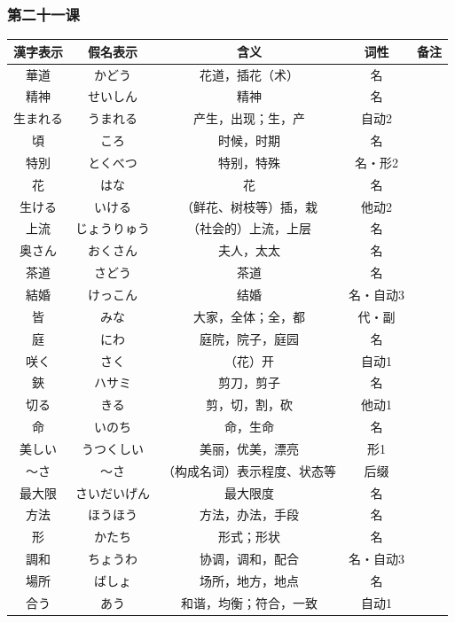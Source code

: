 \subsubsection{第二十一课}
\begin{longtable}{|c|c|c|c|c|}
    \hline
    漢字表示 & 假名表示  & 含义 & 词性 & 备注 \\ \hline\hline
    華道 & かどう & 花道，插花（术） & 名 & \\ \hline
    精神 & せいしん & 精神 & 名 & \\ \hline
    生まれる & うまれる & 产生，出现；生，产 & 自动2 & \\ \hline
    頃 & ころ & 时候，时期 & 名 & \\ \hline
    特別 & とくべつ & 特别，特殊 & 名・形2 & \\ \hline
    花 & はな & 花 & 名 & \\ \hline
    生ける & いける & （鲜花、树枝等）插，栽 & 他动2 & \\ \hline
    上流 & じょうりゅう & （社会的）上流，上层 & 名 & \\ \hline
    奥さん & おくさん & 夫人，太太 & 名 & \\ \hline
    茶道 & さどう & 茶道 & 名 & \\ \hline
    結婚 & けっこん & 结婚 & 名・自动3 & \\ \hline
    皆 & みな & 大家，全体；全，都 & 代・副 & \\ \hline
    庭 & にわ & 庭院，院子，庭园 & 名 & \\ \hline
    咲く & さく & （花）开 & 自动1 & \\ \hline
    鋏 & ハサミ & 剪刀，剪子 & 名 & \\ \hline
    切る & きる & 剪，切，割，砍 & 他动1 & \\ \hline
    命 & いのち & 命，生命 & 名 & \\ \hline
    美しい & うつくしい & 美丽，优美，漂亮 & 形1 & \\ \hline
    〜さ & 〜さ & （构成名词）表示程度、状态等 & 后缀 & \\ \hline
    最大限 & さいだいげん & 最大限度 & 名 & \\ \hline
    方法 & ほうほう & 方法，办法，手段 & 名 & \\ \hline
    形 & かたち & 形式；形状 & 名 & \\ \hline
    調和 & ちょうわ & 协调，调和，配合 & 名・自动3 & \\ \hline
    場所 & ばしょ & 场所，地方，地点 & 名 & \\ \hline
    合う & あう & 和谐，均衡；符合，一致 & 自动1 & \\ \hline

\end{longtable}
